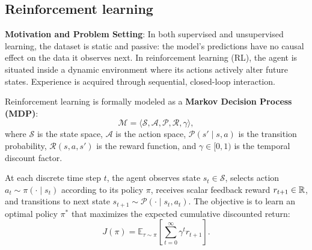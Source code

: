 \subsection{Reinforcement learning}
\label{sec:reinforcement_learning}

\textbf{Motivation and Problem Setting}: In both supervised and unsupervised learning, the dataset is static and passive: the model's predictions have no causal effect on the data it observes next. In reinforcement learning (RL), the agent is situated inside a dynamic environment where its actions actively alter future states. Experience is acquired through sequential, closed-loop interaction.

Reinforcement learning is formally modeled as a \textbf{Markov Decision Process (MDP)}:
\begin{equation}
\mathcal{M} = \langle \mathcal{S}, \mathcal{A}, \mathcal{P}, \mathcal{R}, \gamma \rangle,
\end{equation}
where $\mathcal{S}$ is the state space, $\mathcal{A}$ is the action space, $\mathcal{P}(s' \mid s, a)$ is the transition probability, $\mathcal{R}(s, a, s')$ is the reward function, and $\gamma \in [0, 1)$ is the temporal discount factor.

At each discrete time step $t$, the agent observes state $s_t \in \mathcal{S}$, selects action $a_t \sim \pi(\cdot \mid s_t)$ according to its policy $\pi$, receives scalar feedback reward $r_{t+1} \in \mathbb{R}$, and transitions to next state $s_{t+1} \sim \mathcal{P}(\cdot \mid s_t, a_t)$. The objective is to learn an optimal policy $\pi^*$ that maximizes the expected cumulative discounted return:
\begin{equation}
J(\pi) = \mathbb{E}_{\tau \sim \pi} \left[ \sum_{t=0}^\infty \gamma^t r_{t+1} \right].
\end{equation}

